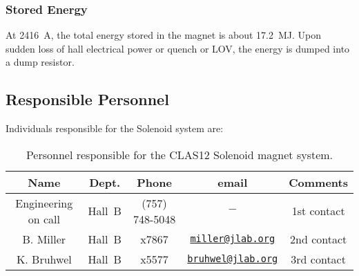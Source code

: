 \subsubsection{Stored Energy}

At 2416~A, the total energy stored in the magnet is about 17.2~MJ. Upon sudden loss of hall 
electrical power or quench or LOV, the energy is dumped into a dump resistor.

\subsection{Responsible Personnel}

Individuals responsible for the Solenoid system are:

\begin{table}[!htb]
\centering
\begin{tabular}{|c|c|c|c|c|} \hline
Name&Dept.&Phone&email&Comments \\ \hline
Engineering on call&Hall~B&(757) 748-5048&$-$& 1st contact \\ \hline
B. Miller&Hall~B& x7867&\href{mailto:miller@jlab.org}{\nolinkurl{miller@jlab.org}}&2nd contact \\ \hline
K. Bruhwel&Hall~B & x5577&\href{mailto:}{\nolinkurl{bruhwel@jlab.org}}&3rd contact \\ \hline
\end{tabular}
\caption{Personnel responsible for the CLAS12 Solenoid magnet system.} 
\label{tb:solenoid}
\end{table}


